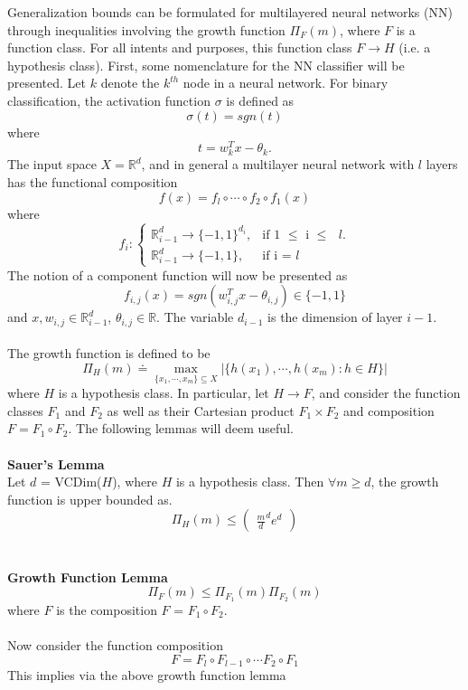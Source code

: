 \documentclass{article} %
\begin{document}
   Generalization bounds can be formulated for multilayered neural networks (NN) through inequalities involving the growth function $\Pi_F(m)$, where $F$ is a function class. For all intents and purposes, this function class $F \rightarrow H$ (i.e. a hypothesis class). First, some nomenclature for the NN classifier will be presented. Let $k$ denote the $k^{th}$ node in a neural network. For binary classification, the activation function $\sigma$ is defined as
$$
\sigma(t) = sgn(t)
$$
where
$$
t = w_k^Tx - \theta_k.
$$
The input space $X = \mathbb{R}^d$, and in general a multilayer neural network with $l$ layers has the functional composition
$$
f(x) = f_l \circ \cdots \circ f_2 \circ f_1 (x)
$$
where
$$
f_i : \begin{cases}
    \mathbb{R}^d_{i-1} \rightarrow \{-1,1\}^{d_i}, & \text{if 1 $\leq$ i $\leq$ $l$}.\\
    \mathbb{R}^d_{i-1} \rightarrow \{-1,1\}, & \text{if i = $l$}
  \end{cases}
$$
The notion of a component function will now be presented as
$$
f_{i,j}(x) = sgn(w_{i,j}^Tx - \theta_{i,j}) \in \{-1,1\}
$$
and $x,w_{i,j} \in \mathbb{R}^d_{i-1}$, $\theta_{i,j} \in \mathbb{R}$. The variable $d_{i-1}$ is the dimension of layer $i-1$.
\\
\\
The growth function is defined to be
$$
\Pi_H(m) \doteq \max_{\{x_1,\cdots,x_m\} \subseteq X} |\{h(x_1),\cdots,h(x_m) : h \in H \} |
$$
where $H$ is a hypothesis class. In particular, let $H \rightarrow F$, and consider the function classes $F_1$ and $F_2$ as well as their Cartesian product $F_1 \times F_2$ and composition $F = F_1 \circ F_2$. The following lemmas will deem useful.
\\
\\
\textbf{Sauer's Lemma}
\\
Let $d$ = VCDim($H$), where $H$ is a hypothesis class. Then $\forall m \geq d$, the growth function is upper bounded as.
$$
\Pi_H(m) \leq \begin{pmatrix}
\frac{m}{d}^de^d
\end{pmatrix}
$$
\\
\\
\textbf{Growth Function Lemma}
$$
\Pi_F(m) \leq \Pi_{F_1}(m)\Pi_{F_2}(m)
$$
where $F$ is the composition $F$ = $F_1 \circ F_2$.
\\
\\
Now consider the function composition
$$
F = F_l \circ F_{l-1} \circ \cdots F_2 \circ F_1
$$
This implies via the above growth function lemma
\end{document}
